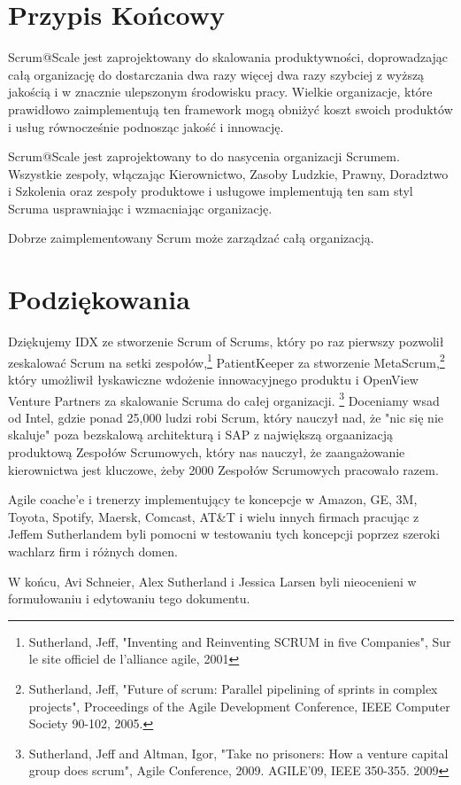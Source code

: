 \documentclass[12pt,a4paper,parskip=full]{scrartcl}
\begin{document}
\section{Przypis Końcowy}

Scrum@Scale jest zaprojektowany do skalowania produktywności, doprowadzając całą organizację do dostarczania dwa razy więcej dwa razy szybciej z wyższą jakością i w znacznie ulepszonym środowisku pracy. Wielkie organizacje, które prawidłowo zaimplementują ten framework mogą obniżyć koszt swoich produktów i usług równocześnie podnosząc jakość i innowację.

Scrum@Scale jest zaprojektowany to do nasycenia organizacji Scrumem. Wszystkie zespoły, włączając Kierownictwo, Zasoby Ludzkie, Prawny, Doradztwo i Szkolenia oraz zespoły produktowe i usługowe implementują ten sam styl Scruma  usprawniając i wzmacniając organizację.

Dobrze zaimplementowany Scrum może zarządzać całą organizacją.

\section{Podziękowania}

Dziękujemy IDX ze stworzenie Scrum of Scrums, który po raz pierwszy pozwolił zeskalować Scrum na setki zespołów,\footnote{Sutherland, Jeff, "Inventing and Reinventing SCRUM in five Companies", Sur le site officiel de l'alliance agile, 2001} PatientKeeper za stworzenie MetaScrum,\footnote{Sutherland, Jeff, "Future of scrum: Parallel pipelining of sprints in complex projects", Proceedings of the Agile Development Conference,  IEEE Computer Society 90-102,  2005.} który umożliwił łyskawiczne wdożenie innowacyjnego produktu i OpenView Venture Partners za skalowanie Scruma do całej organizacji. \footnote{Sutherland, Jeff and Altman, Igor, "Take no prisoners: How a venture capital group does scrum", Agile Conference, 2009. AGILE'09, IEEE 350-355.  2009} Doceniamy wsad od Intel, gdzie ponad 25,000 ludzi robi Scrum, który nauczył nad, że "nic się nie skaluje" poza bezskalową architekturą i SAP z największą orgaanizacją produktową Zespołów Scrumowych, który nas nauczył, że zaangażowanie kierownictwa jest kluczowe, żeby 2000 Zespołów Scrumowych pracowało razem.

Agile coache'e i trenerzy implementujący te koncepcje w Amazon, GE, 3M, Toyota, Spotify, Maersk, Comcast, AT\&T i wielu innych firmach pracując z Jeffem Sutherlandem byli pomocni w testowaniu tych koncepcji poprzez szeroki wachlarz firm i różnych domen.

W końcu, Avi Schneier, Alex Sutherland i Jessica Larsen byli nieocenieni w formułowaniu i edytowaniu tego dokumentu.

\pagebreak

\printbibliography
\end{document}
